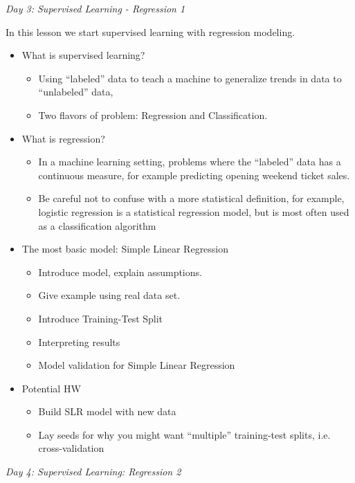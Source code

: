 \documentclass[12pt]{article}
\begin{document}
	
	\noindent
	
	
	\vspace{2mm}
	\noindent
	\textit{\large{Day 3: Supervised Learning - Regression 1}}
	
	\noindent
	In this lesson we start supervised learning with regression modeling.
	
	\begin{itemize}
		\item What is supervised learning?
			\begin{itemize}
				\item Using ``labeled'' data to teach a machine to generalize trends in data to ``unlabeled'' data,
				\item Two flavors of problem: Regression and Classification.
			\end{itemize}
		\item What is regression?
			\begin{itemize}
				\item In a machine learning setting, problems where the ``labeled'' data has a continuous measure, for example predicting opening weekend ticket sales.
				\item Be careful not to confuse with a more statistical definition, for example, logistic regression is a statistical regression model, but is most often used as a classification algorithm
			\end{itemize}
		\item The most basic model: Simple Linear Regression
			\begin{itemize}
				\item Introduce model, explain assumptions.
				\item Give example using real data set.
				\item Introduce Training-Test Split
				\item Interpreting results
				\item Model validation for Simple Linear Regression
			\end{itemize}
		\item Potential HW
			\begin{itemize}
				\item Build SLR model with new data
				\item Lay seeds for why you might want ``multiple'' training-test splits, i.e. cross-validation
			\end{itemize}
	\end{itemize}

	\vspace{2mm}
	\noindent
	\textit{\large{Day 4: Supervised Learning: Regression 2}}
	
\end{document}
